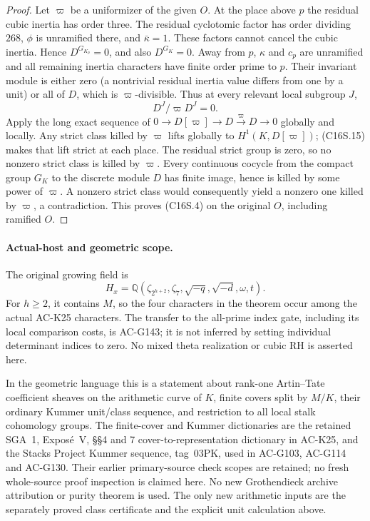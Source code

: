 \begin{proof}
Let $\varpi$ be a uniformizer of the given $O$.
At the place above $p$ the residual cubic inertia has
order three.  The residual cyclotomic factor has order
dividing $268$, $\phi$ is unramified there, and
$\bar\kappa=1$.  These factors cannot cancel the cubic
inertia.  Hence $D^{G_{K_p}}=0$, and also $D^{G_K}=0$.
Away from $p$, $\kappa$ and $c_p$ are unramified and all
remaining inertia characters have finite order prime
to $p$.  Their invariant module is either zero (a
nontrivial residual inertia value differs from one by
a unit) or all of $D$, which is $\varpi$-divisible.
Thus at every relevant local subgroup $J$,
\[
                       D^J/\varpi D^J=0.
 \tag{C16S.15}
\]
Apply the long exact sequence of
$0\to D[\varpi]\to D\xrightarrow{\varpi}D\to0$
globally and locally.  Any strict class killed by
$\varpi$ lifts globally to $H^1(K,D[\varpi])$;
(C16S.15) makes that lift strict at each place.
The residual strict group is zero, so no nonzero strict
class is killed by $\varpi$.
Every continuous cocycle from the compact group $G_K$
to the discrete module $D$ has finite image, hence is
killed by some power of $\varpi$.  A nonzero strict
class would consequently yield a nonzero one killed
by $\varpi$, a contradiction.  This proves (C16S.4)
on the original $O$, including ramified $O$.
\end{proof}

\paragraph{Actual-host and geometric scope.}
The original growing field is
\[
 H_x=\mathbb Q(\zeta_{2^{h+2}},\zeta_7,
 \sqrt{-q},\sqrt{-d},\omega,t).
\]
For $h\geq2$, it contains $M$, so the four characters
in the theorem occur among the actual AC-K25 characters.
The transfer to the all-prime index gate, including its
local comparison costs, is AC-G143; it is not inferred
by setting individual determinant indices to zero.
No mixed theta realization or cubic RH is asserted here.

In the geometric language this is a statement about
rank-one Artin--Tate coefficient sheaves on the arithmetic
curve of $K$, finite covers split by $M/K$, their ordinary
Kummer unit/class sequence, and restriction to all local
stalk cohomology groups.  The finite-cover and Kummer
dictionaries are the retained SGA~1, Expos\'e~V,
\S\S4 and 7 cover-to-representation dictionary in AC-K25,
and the Stacks Project Kummer sequence, tag~03PK, used in
AC-G103, AC-G114 and AC-G130.  Their earlier primary-source
check scopes are retained; no fresh whole-source proof
inspection is claimed here.
No new Grothendieck archive attribution or purity theorem
is used.  The only new arithmetic inputs are the separately
proved class certificate and the explicit unit calculation
above.
